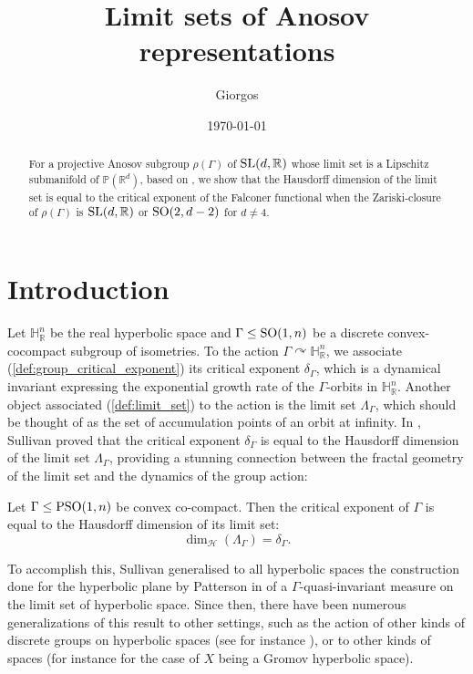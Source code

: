 \documentclass{report}
\title{Limit sets of Anosov representations}
\author{Giorgos}
\date{\today}
\begin{document}
\listoftodos

\maketitle


\begin{abstract}
    For a projective Anosov subgroup $\rho(\Gamma)$ of $\operatorname{{\mathrm{SL}}}(d, \mathbb R)$ whose limit set is a Lipschitz submanifold of $\mathbb P(\mathbb R^d)$, based on \cite{pozzetti_anosov_2023}, we show that the Hausdorff dimension of the limit set is equal to the critical exponent of the Falconer functional when the Zariski-closure of $\rho(\Gamma)$ is $\operatorname{{\mathrm{SL}}}(d, \mathbb R)$ or $\operatorname{{\mathrm{SO}}}(2, d-2)$ for $d \neq 4$. 
\end{abstract}

\tableofcontents

\chapter{Introduction}
Let $\mathbb H_{\mathbb R}^n$ be the real hyperbolic space and $\Gamma \leq \operatorname{{\mathrm{SO}}}(1, n)$ be a discrete convex-cocompact subgroup of isometries.
To the action $\Gamma \curvearrowright \mathbb H_{\mathbb R}^n$, we associate (\cref{def:group_critical_exponent}) its critical exponent $\delta_\Gamma$, which is a dynamical invariant expressing the exponential growth rate of the $\Gamma$-orbits in $\mathbb H_{\mathbb R}^n$.
Another object associated (\cref{def:limit_set}) to the action is the limit set $\Lambda_\Gamma$, which should be thought of as the set of accumulation points of an orbit at infinity.
In \cite{sullivan1979density}, Sullivan proved that the critical exponent $\delta_\Gamma$ is equal to the Hausdorff dimension of the limit set $\Lambda_\Gamma$, providing a stunning connection between the fractal geometry of the limit set and the dynamics of the group action:
\begin{theorem}
    Let $\Gamma \leq \operatorname{{\mathrm{PSO}}}(1,n)$ be convex co-compact.
    Then the critical exponent of $\Gamma$ is equal to the Hausdorff dimension of its limit set:
    \[
    \dim_{\mathcal H}(\Lambda_\Gamma) = \delta_\Gamma.
    \]
\end{theorem}

To accomplish this, Sullivan generalised to all hyperbolic spaces the construction done for the hyperbolic plane by Patterson in \cite{patterson1976limit} of a $\Gamma$-quasi-invariant measure on the limit set of hyperbolic space.
Since then, there have been numerous generalizations of this result to other settings, such as the action of other kinds of discrete groups on hyperbolic spaces (see for instance \cite{roblin2003ergodicite,dal2000series,coornaert1993mesures}), or to other kinds of spaces (for instance \cite{coornaert1993mesures} for the case of $X$ being a Gromov hyperbolic space).
\end{document}
